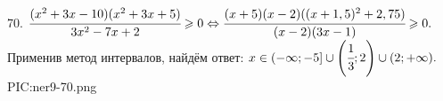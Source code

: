 70. $\cfrac{(x^2+3x-10)(x^2+3x+5)}{3x^2-7x+2}\geqslant0\Leftrightarrow\cfrac{(x+5)(x-2)((x+1,5)^2+2,75)}{(x-2)(3x-1)}\geqslant0.$ Применив метод интервалов, найдём ответ: $x\in(-\infty;-5]\cup\left(\cfrac{1}{3};2\right)\cup(2;+\infty).$
{{PIC:ner9-70.png}}\\
